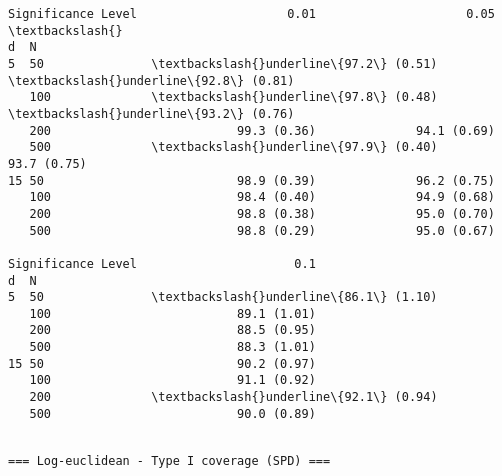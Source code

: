 \documentclass[11pt]{article}
\begin{document}
    
    \begin{Verbatim}[commandchars=\\\{\}]
Significance Level                     0.01                     0.05  \textbackslash{}
d  N                                                                   
5  50               \textbackslash{}underline\{97.2\} (0.51)  \textbackslash{}underline\{92.8\} (0.81)   
   100              \textbackslash{}underline\{97.8\} (0.48)  \textbackslash{}underline\{93.2\} (0.76)   
   200                          99.3 (0.36)              94.1 (0.69)   
   500              \textbackslash{}underline\{97.9\} (0.40)              93.7 (0.75)   
15 50                           98.9 (0.39)              96.2 (0.75)   
   100                          98.4 (0.40)              94.9 (0.68)   
   200                          98.8 (0.38)              95.0 (0.70)   
   500                          98.8 (0.29)              95.0 (0.67)   

Significance Level                      0.1  
d  N                                         
5  50               \textbackslash{}underline\{86.1\} (1.10)  
   100                          89.1 (1.01)  
   200                          88.5 (0.95)  
   500                          88.3 (1.01)  
15 50                           90.2 (0.97)  
   100                          91.1 (0.92)  
   200              \textbackslash{}underline\{92.1\} (0.94)  
   500                          90.0 (0.89)  
    \end{Verbatim}

    
    \begin{Verbatim}[commandchars=\\\{\}]

=== Log-euclidean - Type I coverage (SPD) ===
    \end{Verbatim}
\end{document}
